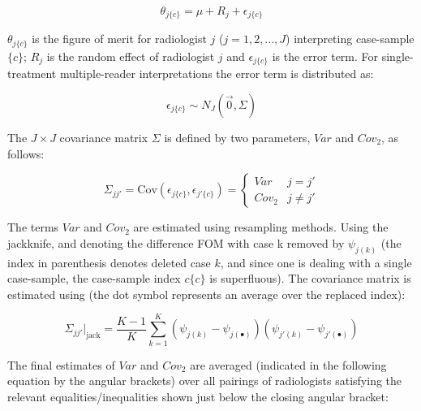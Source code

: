 \documentclass[
]{article}
\begin{document}
\begin{equation}
\theta_{j\{c\}}=\mu+R_j+\epsilon_{j\{c\}}
\label{eq:standalone-or-model-single-treatment}
\end{equation}

\(\theta_{j\{c\}}\) is the figure of merit for radiologist \(j\) (\(j = 1, 2, ..., J\)) interpreting case-sample \(\{c\}\); \(R_j\) is the random effect of radiologist \(j\) and \(\epsilon_{j\{c\}}\) is the error term. For single-treatment multiple-reader interpretations the error term is distributed as:

\begin{equation}
\epsilon_{j\{c\}}\sim N_{J}\left ( \vec{0} , \Sigma \right )
\label{eq:standalone-cad-eps-sampling-single-treatment}
\end{equation}

The \(J \times J\) covariance matrix \(\Sigma\) is defined by two parameters, \(Var\) and \(Cov_2\), as follows:

\begin{equation}
\Sigma_{jj'} = \text{Cov}\left ( \epsilon_{j\{c\}}, \epsilon_{j'\{c\}} \right )
=
\left\{\begin{matrix}
Var & j = j'\\ 
Cov_2 & j \neq j'
\end{matrix}\right.
\label{eq:standalone-cad-var-cov2-single-treatment}
\end{equation}

The terms \(Var\) and \(Cov_2\) are estimated using resampling methods. Using the jackknife, and denoting the difference FOM with case k removed by \(\psi_{j(k)}\) (the index in parenthesis denotes deleted case \(k\), and since one is dealing with a single case-sample, the case-sample index \(c\{c\}\) is superfluous). The covariance matrix is estimated using (the dot symbol represents an average over the replaced index):

\begin{equation}
\Sigma_{jj'}|_\text{jack} = \frac{K-1}{K} \sum_{k=1}^{K} \left ( \psi_{j(k)}  - \psi_{j(\bullet)} \right ) \left ( \psi_{j'(k)}  - \psi_{j'(\bullet)} \right )
\label{eq:standalone-cad-single-treatment-sigma-jackknife}
\end{equation}

The final estimates of \(Var\) and \(Cov_2\) are averaged (indicated in the following equation by the angular brackets) over all pairings of radiologists satisfying the relevant equalities/inequalities shown just below the closing angular bracket:
\end{document}
